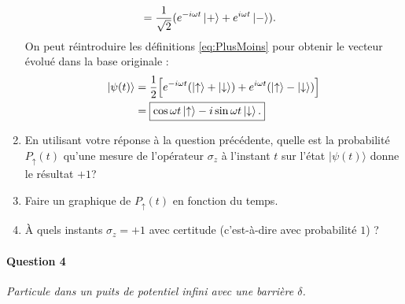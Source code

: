 \begin{enumerate}
{\begin{equation}
\begin{split}
&= \frac{1}{\sqrt{2}} (e^{-i\omega t} \ket{+} + e^{i\omega t} \ket{-}).
\end{split}
\end{equation}
On peut réintroduire les définitions \eqref{eq:PlusMoins} pour obtenir le vecteur évolué dans la base originale :
\begin{equation}
\begin{split}
\ket{\psi(t)} &= \frac{1}{2} \Big[  e^{-i\omega t} (\ket{\uparrow}+\ket{\downarrow}) + e^{i\omega t} (\ket{\uparrow}-\ket{\downarrow})  \Big] \\
&= \boxed { \cos \omega t \ket{\uparrow} - i \sin \omega t \ket{\downarrow}. }
\end{split}
\end{equation}
}

\item
En utilisant votre réponse à la question précédente, quelle est la probabilité $P_\uparrow(t)$ qu'une mesure de l'opérateur $\sigma_z$ à l'instant $t$ sur  l'état $\vert \psi(t)\rangle$ donne le résultat $+1$?
\\ 




\item Faire un graphique de $P_\uparrow(t)$ en fonction du temps.
\\

\item À quels instants $\sigma_z=+1$ avec certitude (c'est-à-dire avec probabilité $1$) ? \\



\end{enumerate}

\paragraph{Question 4} \textit{Particule dans un puits de potentiel infini avec une barrière $\delta$.} \\

